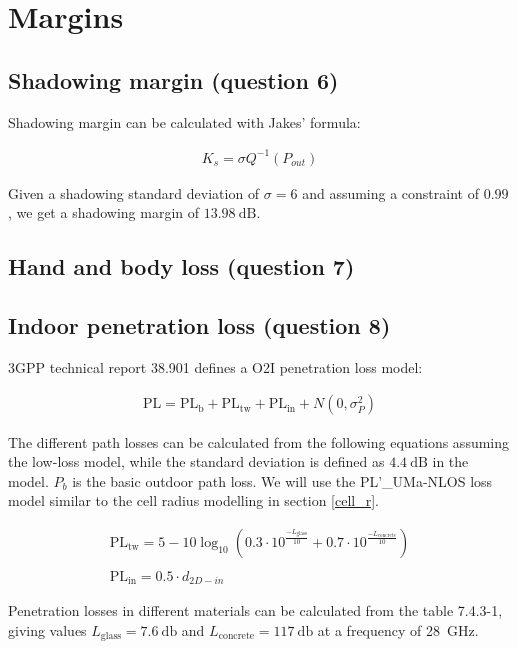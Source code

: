 \documentclass{article}
\begin{document}
\section{Margins}
\subsection{Shadowing margin (question 6)}
Shadowing margin can be calculated with Jakes' formula:

\begin{align*}
      K_s= \sigma Q^{-1}(P_{out})
\end{align*}

Given a shadowing standard deviation of \(\sigma = 6\) and assuming a constraint of \(0.99\), we get a shadowing margin of \(\SI{13.98}{\deci\bel}\).

\subsection{Hand and body loss (question 7)}
\subsection{Indoor penetration loss (question 8)}
3GPP technical report 38.901 defines a O2I penetration loss model:

\begin{align*}
    \mathrm{PL} = \mathrm{PL_b} + \mathrm{PL_{tw}} + \mathrm{PL_{in}} + N(0, \sigma^2_P)
\end{align*}

The different path losses can be calculated from the following equations assuming the low-loss model, while the standard deviation is defined as \(\SI{4.4}{\deci\bel}\) in the model. \(P_b\) is the basic outdoor path loss. We will use the PL’\_UMa-NLOS loss model similar to the cell radius modelling in section \ref{cell_r}.

\begin{gather*}
    \mathrm{PL_{tw}} = 5-10\log_{10} (0.3 \cdot 10^{\frac{-L_{\mathrm{glass}}}{10}} + 0.7 \cdot 10^{\frac{-L_{\mathrm{concrete}}}{10}}) \\ \\
    \mathrm{PL_{in}} = 0.5 \cdot d_{2D-in}
\end{gather*}

Penetration losses in different materials can be calculated from the table 7.4.3-1, giving values \(L_{\mathrm{glass}} = \SI{7.6}{\decibel}\) and \(L_{\mathrm{concrete}} = \SI{117}{\decibel}\) at a frequency of 28\ GHz.
\end{document}
